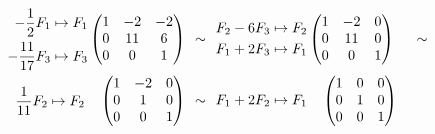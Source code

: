     \[
        \begin{aligned}
            \begin{aligned}
                -\frac{1}{2}F_1 &\mapsto F_1 \\
                -\frac{11}{17}F_3 &\mapsto F_3 \\
            \end{aligned}
            \begin{pmatrix}
                1 & -2 & -2 \\ 
                0 & 11 & 6 \\ 
                0 & 0 & 1
            \end{pmatrix}
            \hspace{0.15cm}
            &\sim
            \hspace{0.15cm}
            \begin{aligned}
                F_2 - 6F_3 &\mapsto F_2 \\
                F_1 + 2F_3 &\mapsto F_1 
            \end{aligned}
            \begin{pmatrix}
                1 & -2 & 0 \\ 
                0 & 11 & 0\\ 
                0 & 0 & 1
            \end{pmatrix}
            \hspace{0.15cm}
            &\sim
            \hspace{0.15cm}
            \\
            \begin{aligned}
                \frac{1}{11}F_2 &\mapsto F_2
            \end{aligned}
            \begin{pmatrix}
                1 & -2 & 0 \\ 
                0 & 1 & 0 \\ 
                0 & 0 & 1
            \end{pmatrix}
            \hspace{0.15cm}
            &\sim
            \hspace{0.15cm}
            \begin{aligned}
                F_1 + 2F_2 &\mapsto F_1
            \end{aligned}
            \begin{pmatrix}
                1 & 0 & 0 \\ 
                0 & 1 & 0 \\ 
                0 & 0 & 1
            \end{pmatrix}
            \hspace{0.15cm}
            &\phantom{\sim}
            \hspace{0.15cm}
        \end{aligned}
    \]
